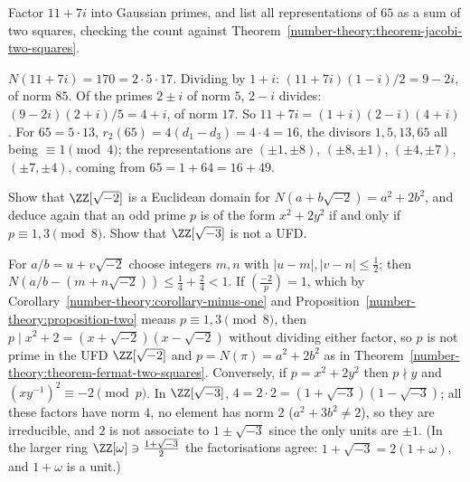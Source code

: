 \begin{exercise}\label{number-theory:exercise-gaussian-factor}
Factor $11 + 7i$ into Gaussian primes, and list all representations of $65$ as a sum of two squares, checking the count against Theorem~\ref{number-theory:theorem-jacobi-two-squares}.
\end{exercise}

\begin{solution}
$N(11 + 7i) = 170 = 2 \cdot 5 \cdot 17$. Dividing by $1 + i$: $(11 + 7i)(1 - i)/2 = 9 - 2i$, of norm $85$. Of the primes $2 \pm i$ of norm $5$, $2 - i$ divides: $(9 - 2i)(2 + i)/5 = 4 + i$, of norm $17$.
So $11 + 7i = (1 + i)(2 - i)(4 + i)$. For $65 = 5 \cdot 13$, $r_2(65) = 4(d_1 - d_3) = 4 \cdot 4 = 16$, the divisors $1, 5, 13, 65$ all being $\equiv 1 \pmod 4$; the representations are
$(\pm1, \pm8)$, $(\pm8, \pm1)$, $(\pm4, \pm7)$, $(\pm7, \pm4)$, coming from $65 = 1 + 64 = 16 + 49$.
\end{solution}

\begin{exercise}\label{number-theory:exercise-sqrt-minus-two}
Show that $\ZZ[\sqrt{-2}]$ is a Euclidean domain for $N(a + b\sqrt{-2}) = a^2 + 2b^2$, and deduce again that an odd prime $p$ is of the form $x^2 + 2y^2$ if and only if $p \equiv 1, 3 \pmod 8$. Show that
$\ZZ[\sqrt{-3}]$ is not a UFD.
\end{exercise}

\begin{solution}
For $a/b = u + v\sqrt{-2}$ choose integers $m, n$ with $|u - m|, |v - n| \leq \frac12$; then $N(a/b - (m + n\sqrt{-2})) \leq \frac14 + \frac24 < 1$. If $(\frac{-2}{p}) = 1$, which by
Corollary~\ref{number-theory:corollary-minus-one} and Proposition~\ref{number-theory:proposition-two} means $p \equiv 1, 3 \pmod 8$, then $p \mid x^2 + 2 = (x + \sqrt{-2})(x - \sqrt{-2})$ without dividing either
factor, so $p$ is not prime in the UFD $\ZZ[\sqrt{-2}]$ and $p = N(\pi) = a^2 + 2b^2$ as in Theorem~\ref{number-theory:theorem-fermat-two-squares}. Conversely, if $p = x^2 + 2y^2$ then $p \nmid y$ and
$(xy^{-1})^2 \equiv -2 \pmod p$. In $\ZZ[\sqrt{-3}]$, $4 = 2 \cdot 2 = (1 + \sqrt{-3})(1 - \sqrt{-3})$; all these factors have norm $4$, no element has norm $2$ ($a^2 + 3b^2 \neq 2$), so they are irreducible, and
$2$ is not associate to $1 \pm \sqrt{-3}$ since the only units are $\pm1$. (In the larger ring $\ZZ[\omega] \ni \frac{1 + \sqrt{-3}}{2}$ the factorisations agree: $1 + \sqrt{-3} = 2(1 + \omega)$, and $1 + \omega$ is a unit.)
\end{solution}

